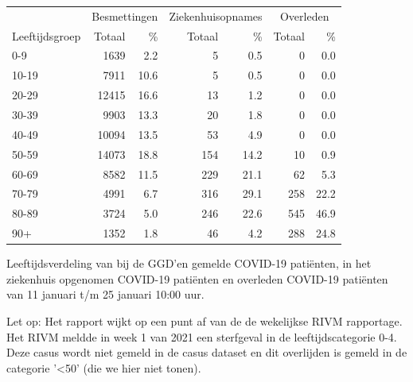 \documentclass[
  english,
  man,floatsintext]{apa6}
\begin{document}
\begin{table}[H]
\centering\begingroup\fontsize{11}{13}\selectfont

\begin{threeparttable}
\begin{tabular}{lrrrrrr}
\toprule
\multicolumn{1}{c}{ } & \multicolumn{2}{c}{Besmettingen} & \multicolumn{2}{c}{Ziekenhuisopnames} & \multicolumn{2}{c}{Overleden} \\
\cmidrule(l{3pt}r{3pt}){2-3} \cmidrule(l{3pt}r{3pt}){4-5} \cmidrule(l{3pt}r{3pt}){6-7}
Leeftijdsgroep & Totaal & \% & Totaal & \% & Totaal & \%\\
\midrule
0-9 & 1639 & 2.2 & 5 & 0.5 & 0 & 0.0\\
10-19 & 7911 & 10.6 & 5 & 0.5 & 0 & 0.0\\
20-29 & 12415 & 16.6 & 13 & 1.2 & 0 & 0.0\\
30-39 & 9903 & 13.3 & 20 & 1.8 & 0 & 0.0\\
40-49 & 10094 & 13.5 & 53 & 4.9 & 0 & 0.0\\
50-59 & 14073 & 18.8 & 154 & 14.2 & 10 & 0.9\\
60-69 & 8582 & 11.5 & 229 & 21.1 & 62 & 5.3\\
70-79 & 4991 & 6.7 & 316 & 29.1 & 258 & 22.2\\
80-89 & 3724 & 5.0 & 246 & 22.6 & 545 & 46.9\\
90+ & 1352 & 1.8 & 46 & 4.2 & 288 & 24.8\\
\bottomrule
\end{tabular}
\begin{tablenotes}
\item[1] Leeftijdsverdeling van bij de GGD’en gemelde COVID-19 patiënten, in het ziekenhuis opgenomen COVID-19 patiënten en overleden COVID-19 patiënten van 11 januari t/m 25 januari 10:00 uur.
\item[2] Let op: Het rapport wijkt op een punt af van de de wekelijkse RIVM rapportage. Het RIVM meldde in week 1 van 2021 een sterfgeval in de leeftijdscategorie 0-4. Deze casus wordt niet gemeld in de casus dataset en dit overlijden is gemeld in de categorie '<50' (die we hier niet tonen).
\end{tablenotes}
\end{threeparttable}
\endgroup{}
\end{table}

\newpage
\end{document}

